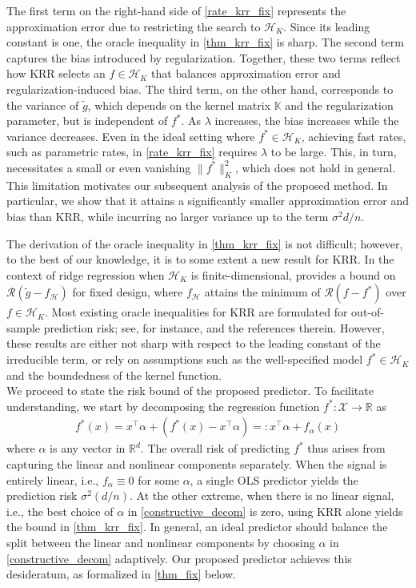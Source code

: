 \documentclass[11pt,twoside]{article}
\def\KK{\mathbb{K}}
\def\RR{\mathbb{R}}
\def\cH{\mathcal H}
\def\cR{\mathcal R}
\def\cX{\mathcal{X}}
\def\wt{\widetilde}
\def\T{\top}
\begin{document}
The first term on the right-hand side of \eqref{rate_krr_fix} represents the approximation error due to restricting the search to $\cH_K$. Since its leading constant is one, the oracle inequality in \cref{thm_krr_fix} is sharp. The second term captures the bias introduced by regularization. Together, these two terms reflect how KRR selects an $f \in \cH_K$ that balances approximation error and regularization-induced bias. The third term, on the other hand, corresponds to the variance of $\wt g$, which depends on the kernel matrix $\KK$ and the regularization parameter, but is independent of $f^*$. 
As $\lambda$ increases, the bias increases while the variance decreases. Even in the ideal setting where $f^* \in \cH_K$, achieving fast rates, such as parametric rates, in \eqref{rate_krr_fix} requires $\lambda$ to be large. This, in turn, necessitates a small or even vanishing $\|f^*\|_K^2$, which does not hold in general. This limitation motivates our subsequent analysis of the proposed method. In particular, we show that it attains a significantly smaller approximation error and bias than KRR, while incurring no larger variance up to the term $\sigma^2 d/n$. 

The derivation of the oracle inequality in \cref{thm_krr_fix} is not difficult; however, to the best of our knowledge, it is to some extent a new result for KRR. In the context of ridge regression when $\cH_K$ is finite-dimensional, \citet[Proposition 1]{hsu2014random} provides a bound on $\cR(\wt g - f_{\cH})$ for fixed design, where $f_{\cH}$ attains the minimum of $\cR(f - f^*)$ over $f\in \cH_K$. Most existing oracle inequalities for KRR are formulated for out-of-sample prediction risk; see, for instance, \cite{mourtada2022elementary} and the references therein. However, these results are either not sharp with respect to the leading constant of the irreducible term, or rely on assumptions such as the well-specified model $f^* \in \cH_K$ and the boundedness of the kernel function. \\

We proceed to state the risk bound of the proposed predictor. 
To facilitate understanding, we start by decomposing the regression function $f^*:\cX \to \RR$ as   
 \begin{align}\label{constructive_decom}
     f^*(x) =  x^\T \alpha + (f^*(x) - x^\T \alpha) =: x^\T \alpha + f_\alpha(x)
 \end{align}
where  $\alpha$ is any vector in $\RR^d$. 
The overall risk of predicting $f^*$ thus arises from capturing the linear and nonlinear components separately.  When the signal is entirely linear, i.e., $f_\alpha \equiv 0$ for some $\alpha$, a single OLS predictor yields the prediction risk $\sigma^2 (d/n)$. At the other extreme, when there is no linear signal, i.e., the best choice of $\alpha$ in \eqref{constructive_decom} is zero, using  KRR alone yields the bound in \cref{thm_krr_fix}. In general, an ideal predictor should balance the split between the linear and nonlinear components by choosing $\alpha$ in \eqref{constructive_decom} adaptively. Our proposed predictor achieves this desideratum, as formalized in \cref{thm_fix} below.
\end{document}
